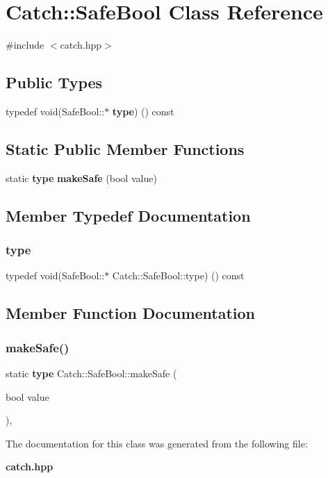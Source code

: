 \section{Catch\+:\+:Safe\+Bool Class Reference}
\label{class_catch_1_1_safe_bool}


{\ttfamily \#include $<$catch.\+hpp$>$}

\subsection*{Public Types}
\begin{DoxyCompactItemize}
\item 
typedef void(Safe\+Bool\+::$\ast$ \textbf{ type}) () const
\end{DoxyCompactItemize}
\subsection*{Static Public Member Functions}
\begin{DoxyCompactItemize}
\item 
static \textbf{ type} \textbf{ make\+Safe} (bool value)
\end{DoxyCompactItemize}


\subsection{Member Typedef Documentation}
\mbox{\label{class_catch_1_1_safe_bool_a39eef9baed296299d625a54d54a2a958}} 
\subsubsection{type}
{\footnotesize\ttfamily typedef void(Safe\+Bool\+::$\ast$ Catch\+::\+Safe\+Bool\+::type) () const}



\subsection{Member Function Documentation}
\mbox{\label{class_catch_1_1_safe_bool_af0ea63d9820f8bf7a8b76377913c4e77}} 
\subsubsection{make\+Safe()}
{\footnotesize\ttfamily static \textbf{ type} Catch\+::\+Safe\+Bool\+::make\+Safe (\begin{DoxyParamCaption}\item[{bool}]{value }\end{DoxyParamCaption})\hspace{0.3cm}{\ttfamily [inline]}, {\ttfamily [static]}}



The documentation for this class was generated from the following file\+:\begin{DoxyCompactItemize}
\item 
\textbf{ catch.\+hpp}\end{DoxyCompactItemize}

